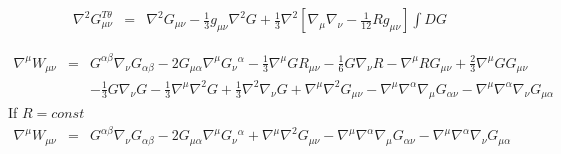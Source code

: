 \documentclass[10pt,letterpaper]{article}
\numberwithin{equation}{section}
\begin{document}
\begin{appendices}
\begin{eqnarray}
\nabla^2 G_{\mu\nu}^{T\theta}&=&\nabla^2 G_{\mu\nu}-\frac13 g_{\mu\nu}\nabla^2 G+\frac13 \nabla^2  \left[\nabla_\mu \nabla_\nu -\frac{1}{12} R g_{\mu\nu} \right]\int D G 
\end{eqnarray}

\begin{eqnarray}
\nabla^\mu W_{\mu\nu} &=& G^{\alpha\beta}\nabla_\nu G_{\alpha\beta} -2G_{\mu\alpha}\nabla^\mu G_{\nu}{}^\alpha
-\tfrac13\nabla^\mu G R_{\mu\nu} -\tfrac16G \nabla_\nu R - \nabla^\mu R G_{\mu\nu} + \tfrac23 \nabla^\mu G G_{\mu\nu} 
\nonumber\\
&&
-\tfrac13 G\nabla_\nu G - \tfrac13 \nabla^\mu \nabla^2 G + \tfrac13 \nabla^2 \nabla_\nu G + \nabla^\mu \nabla^2 G_{\mu\nu} - \nabla^\mu \nabla^\alpha\nabla_\mu G_{\alpha\nu} - \nabla^\mu \nabla^\alpha\nabla_\nu G_{\mu\alpha}
\end{eqnarray}
If $R=const$
\begin{eqnarray}
\nabla^\mu W_{\mu\nu} &=& G^{\alpha\beta}\nabla_\nu G_{\alpha\beta} -2G_{\mu\alpha}\nabla^\mu G_{\nu}{}^\alpha
+ \nabla^\mu \nabla^2 G_{\mu\nu} - \nabla^\mu \nabla^\alpha\nabla_\mu G_{\alpha\nu} - \nabla^\mu \nabla^\alpha\nabla_\nu G_{\mu\alpha}
\end{eqnarray}

%
%

\end{appendices}
\end{document}

